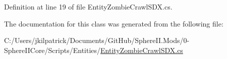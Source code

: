 Definition at line 19 of file Entity\+Zombie\+Crawl\+S\+D\+X.\+cs.



The documentation for this class was generated from the following file\+:\begin{DoxyCompactItemize}
\item 
C\+:/\+Users/jkilpatrick/\+Documents/\+Git\+Hub/\+Sphere\+I\+I.\+Mods/0-\/\+Sphere\+I\+I\+Core/\+Scripts/\+Entities/\mbox{\hyperlink{_entity_zombie_crawl_s_d_x_8cs}{Entity\+Zombie\+Crawl\+S\+D\+X.\+cs}}\end{DoxyCompactItemize}
